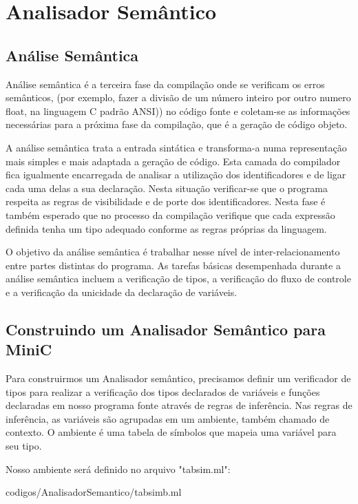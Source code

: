 \documentclass[12pt,a4paper,twoside]{report}
\begin{document}
\chapter{Analisador Semântico}

\section{Análise Semântica}

Análise semântica é a terceira fase da compilação onde se verificam os erros semânticos, (por exemplo, fazer a divisão de um número inteiro por outro numero float, na linguagem C padrão ANSI)) no código fonte e coletam-se as informações necessárias para a próxima fase da compilação, que é a geração de código objeto.

A análise semântica trata a entrada sintática e transforma-a numa representação mais simples e mais adaptada a geração de código. Esta camada do compilador fica igualmente encarregada de analisar a utilização dos identificadores e de ligar cada uma delas a sua declaração. Nesta situação verificar-se que o programa respeita as regras de visibilidade e de porte dos identificadores. Nesta fase é também esperado que no processo da compilação verifique que cada expressão definida tenha um tipo adequado conforme as regras próprias da linguagem.

O objetivo da análise semântica é trabalhar nesse nível de inter-relacionamento entre partes distintas do programa. As tarefas básicas desempenhada durante a análise semântica incluem a verificação de tipos, a verificação do fluxo de controle e a verificação da unicidade da declaração de variáveis. 

\section{Construindo um Analisador Semântico para MiniC}

Para construirmos um Analisador semântico, precisamos definir um verificador de tipos para realizar a verificação dos tipos declarados de variáveis e funções declaradas em nosso programa fonte através de regras de inferência. Nas regras de inferência, as variáveis são agrupadas em um ambiente, também chamado de contexto. O ambiente é uma tabela de símbolos que mapeia uma variável para seu tipo.

Nosso ambiente será definido no arquivo "tabsim.ml":

 {codigos/AnalisadorSemantico/tabsimb.ml}
\end{document}
